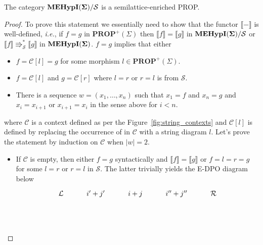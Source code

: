 \begin{proposition}
    \label{proof:appendix:soundness}
The category ${\mathbf{MEHypI(\Sigma)}}/{\mathcal{S}}$ is a semilattice-enriched PROP. 
\end{proposition}
\begin{proof}
    To prove this statement we essentially need to show that the functor $\llbracket - \rrbracket$ is well-defined, \textit{i.e.}, if $f = g$ in $\textbf{PROP}^{+}(\Sigma)$ then $\llbracket f\rrbracket = \llbracket g \rrbracket$ in ${\mathbf{MEHypI(\Sigma)}} / \mathcal{S}$ or $\llbracket f \rrbracket \Rrightarrow_{\mathcal{S}}^{*} \llbracket g \rrbracket$ in ${\mathbf{MEHypI(\Sigma)}}$.
    $f = g$ implies that either
    \begin{itemize}
        \item $f = \mathcal{C}[l] = g$ for some morphism $l \in \textbf{PROP}^{+}(\Sigma)$.
        \item $f = \mathcal{C}[l]$ and $g = \mathcal{C}[r]$ where $l = r$ or $r = l$ is from $\mathcal{S}$.
        \item There is a sequence $w = (x_1, \ldots, x_n)$ such that $x_1 = f$ and $x_n = g$ and $x_i = x_{i+1}$ or $x_{i+1} = x_{i}$ in the sense above for $i < n$.
    \end{itemize}
    where $\mathcal{C}$ is a context defined as per the Figure~\ref{fig:string_contexts} and $\mathcal{C}[l]$ is defined by replacing the occurrence of
    in $\mathcal{C}$ with a string diagram $l$.
    Let's prove the statement by induction on $\mathcal{C}$ when $|w| = 2$.
    \begin{itemize}
        \item If $\mathcal{C}$ is empty, then either $f = g$ syntactically and $\llbracket f \rrbracket = \llbracket g \rrbracket$ or $f = l = r = g$ for some $l = r$ or $r = l$ in $\mathcal{S}$.
              The latter trivially yields the E-DPO diagram below
              \[
                \begin{tikzcd}
                    {\mathcal{L}} & {i'+j'} & {i+j} & {i''+j''} & {\mathcal{R}} \\
                    \\

\end{tikzcd}\]
\end{itemize}
\end{proof}
